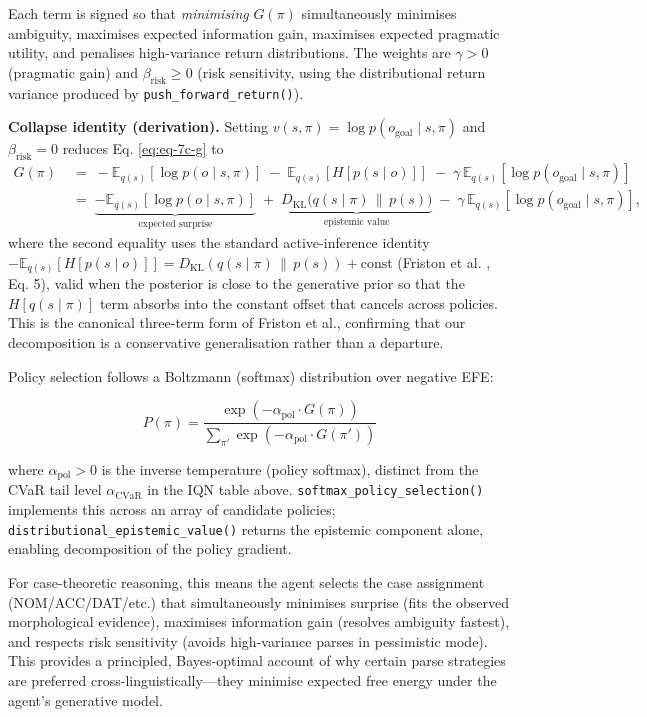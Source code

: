 \documentclass[
]{article}
\begin{document}
Each term is signed so that \emph{minimising} \(G(\pi)\) simultaneously
minimises ambiguity, maximises expected information gain, maximises
expected pragmatic utility, and penalises high-variance return
distributions. The weights are \(\gamma>0\) (pragmatic gain) and
\(\beta_{\mathrm{risk}}\ge 0\) (risk sensitivity, using the
distributional return variance produced by
\texttt{push\_forward\_return()}).

\textbf{Collapse identity (derivation).} Setting
\(v(s,\pi) = \log p(o_{\text{goal}} \mid s,\pi)\) and
\(\beta_{\mathrm{risk}} = 0\) reduces Eq. \ref{eq:eq-7c-g} to
\begin{align*}
G(\pi) \;&=\; -\mathbb{E}_{q(s)}[\log p(o \mid s,\pi)] \;-\; \mathbb{E}_{q(s)}[H[p(s \mid o)]] \;-\; \gamma\,\mathbb{E}_{q(s)}[\log p(o_{\text{goal}} \mid s,\pi)]\\
\;&=\; \underbrace{-\mathbb{E}_{q(s)}[\log p(o \mid s,\pi)]}_{\text{expected surprise}} \;+\; \underbrace{D_{\mathrm{KL}}\bigl(q(s\mid\pi)\,\|\,p(s)\bigr)}_{\text{epistemic value}} \;-\; \gamma\,\mathbb{E}_{q(s)}[\log p(o_{\text{goal}} \mid s,\pi)],
\end{align*} where the second equality uses the standard
active-inference identity
\(-\mathbb{E}_{q(s)}[H[p(s\mid o)]] = D_{\mathrm{KL}}(q(s\mid\pi) \,\|\, p(s)) + \text{const}\)
(Friston et al. \citeyearpar{friston2017active}, Eq. 5), valid when the
posterior is close to the generative prior so that the
\(H[q(s\mid\pi)]\) term absorbs into the constant offset that cancels
across policies. This is the canonical three-term form of Friston et
al., confirming that our decomposition is a conservative generalisation
rather than a departure.

Policy selection follows a Boltzmann (softmax) distribution over
negative EFE:

\begin{equation}
P(\pi) = \frac{\exp(-\alpha_{\mathrm{pol}} \cdot G(\pi))}{\sum_{\pi'} \exp(-\alpha_{\mathrm{pol}} \cdot G(\pi'))}
\label{eq:eq-7c-softmax}
\end{equation}

where \(\alpha_{\mathrm{pol}} > 0\) is the inverse temperature (policy
softmax), distinct from the CVaR tail level \(\alpha_{\mathrm{CVaR}}\)
in the IQN table above. \texttt{softmax\_policy\_selection()} implements
this across an array of candidate policies;
\texttt{distributional\_epistemic\_value()} returns the epistemic
component alone, enabling decomposition of the policy gradient.

For case-theoretic reasoning, this means the agent selects the case
assignment (NOM/ACC/DAT/etc.) that simultaneously minimises surprise
(fits the observed morphological evidence), maximises information gain
(resolves ambiguity fastest), and respects risk sensitivity (avoids
high-variance parses in pessimistic mode). This provides a principled,
Bayes-optimal account of why certain parse strategies are preferred
cross-linguistically---they minimise expected free energy under the
agent's generative model.
\end{document}
